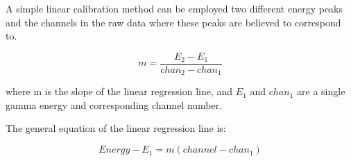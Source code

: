 A simple linear calibration method can be employed two different energy
peaks and the channels in the raw data where these peaks are believed to
correspond to.


\begin{equation}
m=\frac{E_2-E_1}{chan_2-chan_1}
\end{equation}

where m is the slope of the linear regression line, and  $E_1$ and
$chan_1$ are a single gamma energy and corresponding channel number.

The general equation of the linear regression line is:

\begin{equation}
Energy-E_1=m(channel-chan_1)
\end{equation}
